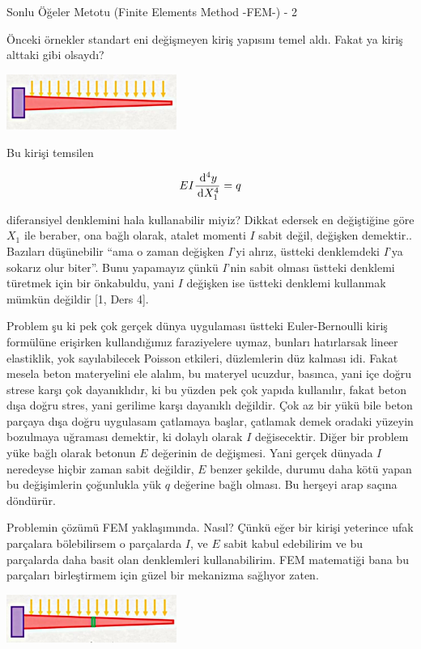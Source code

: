 \documentclass[12pt,fleqn]{article}\usepackage{../../common}
\begin{document}
Sonlu Öğeler Metotu (Finite Elements Method -FEM-) - 2

Önceki örnekler standart eni değişmeyen kiriş yapısını temel aldı.  Fakat ya
kiriş alttaki gibi olsaydı?

\includegraphics[width=15em]{compscieng_bpp45fem2_01.jpg}

Bu kirişi temsilen

$$
E I \frac{\,\mathrm{d}^4 y}{\,\mathrm{d} X_1^4} = q
$$

diferansiyel denklemini hala kullanabilir miyiz? Dikkat edersek en değiştiğine
göre $X_1$ ile beraber, ona bağlı olarak, atalet momenti $I$ sabit değil,
değişken demektir.. Bazıları düşünebilir ``ama o zaman değişken $I$'yi alırız,
üstteki denklemdeki $I$'ya sokarız olur biter''. Bunu yapamayız çünkü $I$'nin
sabit olması üstteki denklemi türetmek için bir önkabuldu, yani $I$ değişken ise
üstteki denklemi kullanmak mümkün değildir [1, Ders 4].

Problem şu ki pek çok gerçek dünya uygulaması üstteki Euler-Bernoulli kiriş
formülüne erişirken kullandığımız faraziyelere uymaz, bunları hatırlarsak lineer
elastiklik, yok sayılabilecek Poisson etkileri, düzlemlerin düz kalması idi.
Fakat mesela beton materyelini ele alalım, bu materyel ucuzdur, basınca, yani
içe doğru strese karşı çok dayanıklıdır, ki bu yüzden pek çok yapıda kullanılır,
fakat beton dışa doğru stres, yani gerilime karşı dayanıklı değildir. Çok az bir
yükü bile beton parçaya dışa doğru uygulasam çatlamaya başlar, çatlamak demek
oradaki yüzeyin bozulmaya uğraması demektir, ki dolaylı olarak $I$
değisecektir. Diğer bir problem yüke bağlı olarak betonun $E$ değerinin de
değişmesi. Yani gerçek dünyada $I$ neredeyse hiçbir zaman sabit değildir, $E$
benzer şekilde, durumu daha kötü yapan bu değişimlerin çoğunlukla yük $q$
değerine bağlı olması. Bu herşeyi arap saçına döndürür.

Problemin çözümü FEM yaklaşımında. Nasıl? Çünkü eğer bir kirişi yeterince ufak
parçalara bölebilirsem o parçalarda $I$, ve $E$ sabit kabul edebilirim ve bu
parçalarda daha basit olan denklemleri kullanabilirim. FEM matematiği bana bu
parçaları birleştirmem için güzel bir mekanizma sağlıyor zaten.

\includegraphics[width=15em]{compscieng_bpp45fem2_02.jpg}
\end{document}
